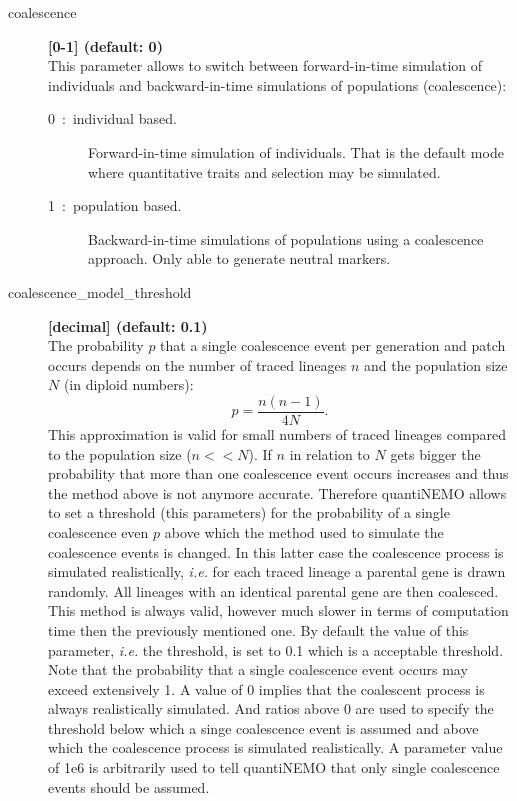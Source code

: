 \documentclass[letterpaper,12pt,oneside]{book}
\begin{document}
\begin{description}
\item[coalescence] \textbf{[0-1] (default: 0)}\\ 
This parameter allows to switch between forward-in-time simulation of individuals and backward-in-time simulations of populations (coalescence):
\begin{description}
\item[0~:~individual based.] Forward-in-time simulation of individuals. That is the default mode where quantitative traits and selection may be simulated. 
\item[1~:~population based.] Backward-in-time simulations of populations using a coalescence approach. Only able to generate neutral markers.
\end{description}

\item[coalescence\_model\_threshold] \textbf{[decimal] (default: 0.1)}\\ 
The probability $p$ that a single coalescence event per generation and patch occurs depends on the number of traced lineages $n$ and the population size $N$ (in diploid numbers):
	\[
	p = \frac{n(n-1)}{4N}.
\]  
This approximation is valid for small numbers of traced lineages compared to the population size ($n<<N$). If $n$ in relation to $N$ gets bigger the probability that more than one coalescence event occurs increases and thus the method above is not anymore accurate. Therefore quantiNEMO allows to set a threshold (this parameters) for the probability of a single coalescence even $p$ above which the method used to simulate the coalescence events is changed. In this latter case the coalescence process is simulated realistically, \textit{i.e.} for each traced lineage a parental gene is drawn randomly. All lineages with an identical parental gene are then coalesced. This method is always valid, however much slower in terms of computation time then the previously mentioned one. By default the value of this parameter, \textit{i.e.} the threshold, is set to 0.1 which is a acceptable threshold. Note that the probability that a single coalescence event occurs may exceed extensively 1. A value of 0 implies that the coalescent process is always realistically simulated. And ratios above 0 are used to specify the threshold below which a singe coalescence event is assumed and above which the coalescence process is simulated realistically. A parameter value of 1e6 is arbitrarily used to tell quantiNEMO that only single coalescence events should be assumed.    


\end{description}
\end{document}
